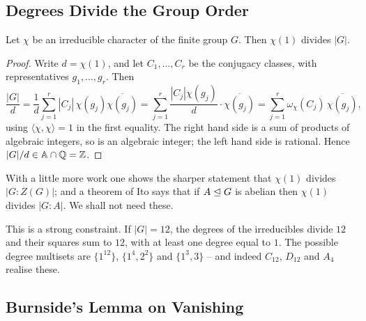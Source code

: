 \documentclass[a4paper]{scrartcl}
\newcommand{\ip}[2]{\langle #1, #2 \rangle}
\begin{document}
\subsection{Degrees Divide the Group Order}

\begin{theorem}
	Let $\chi$ be an irreducible character of the finite group $G$. Then $\chi(1)$ divides $|G|$.
\end{theorem}
\begin{proof}
	Write $d = \chi(1)$, and let $C_1,\dots,C_r$ be the conjugacy classes, with representatives $g_1,\dots,g_r$. Then
	$$\frac{|G|}{d} = \frac{1}{d}\sum_{j=1}^r|C_j|\,\chi(g_j)\overline{\chi(g_j)} = \sum_{j=1}^r\frac{|C_j|\chi(g_j)}{d}\cdot\overline{\chi(g_j)} = \sum_{j=1}^r\omega_\chi(C_j)\,\overline{\chi(g_j)},$$
	using $\ip\chi\chi = 1$ in the first equality. The right hand side is a sum of products of algebraic integers, so is an algebraic integer; the left hand side is rational. Hence $|G|/d\in\mathbb A\cap\mathbb{Q} = \mathbb{Z}$.
\end{proof}

\begin{remark}
	With a little more work one shows the sharper statement that $\chi(1)$ divides $|G:Z(G)|$; and a theorem of Ito says that if $A\trianglelefteq G$ is abelian then $\chi(1)$ divides $|G:A|$. We shall not need these.
\end{remark}

\begin{example}
	This is a strong constraint. If $|G| = 12$, the degrees of the irreducibles divide $12$ and their squares sum to $12$, with at least one degree equal to $1$. The possible degree multisets are $\{1^{12}\}$, $\{1^4,2^2\}$ and $\{1^3,3\}$ -- and indeed $C_{12}$, $D_{12}$ and $A_4$ realise these.
\end{example}

\subsection{Burnside's Lemma on Vanishing}
\end{document}
